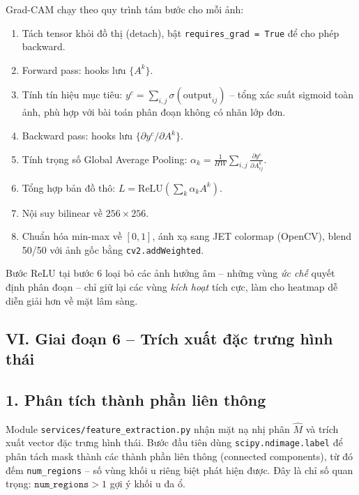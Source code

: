 Grad-CAM chạy theo quy trình tám bước cho mỗi ảnh:

\begin{enumerate}
    \item Tách tensor khỏi đồ thị (detach), bật \texttt{requires\_grad = True} để cho phép backward.
    \item Forward pass: hooks lưu $\{A^k\}$.
    \item Tính tín hiệu mục tiêu: $y^c = \sum_{i,j} \sigma(\text{output}_{ij})$ -- tổng xác suất sigmoid toàn ảnh, phù hợp với bài toán phân đoạn không có nhãn lớp đơn.
    \item Backward pass: hooks lưu $\{\partial y^c / \partial A^k\}$.
    \item Tính trọng số Global Average Pooling: $\alpha_k = \frac{1}{HW}\sum_{i,j} \frac{\partial y^c}{\partial A^k_{ij}}$.
    \item Tổng hợp bản đồ thô: $L = \text{ReLU}\!\left(\sum_k \alpha_k A^k\right)$.
    \item Nội suy bilinear về $256\times256$.
    \item Chuẩn hóa min-max về $[0, 1]$, ánh xạ sang JET colormap (OpenCV), blend 50/50 với ảnh gốc bằng \texttt{cv2.addWeighted}.
\end{enumerate}

Bước ReLU tại bước 6 loại bỏ các ảnh hưởng âm -- những vùng \textit{ức chế} quyết định phân đoạn -- chỉ giữ lại các vùng \textit{kích hoạt} tích cực, làm cho heatmap dễ diễn giải hơn về mặt lâm sàng.

\subsection*{VI. Giai đoạn 6 -- Trích xuất đặc trưng hình thái}

\subsection*{1. Phân tích thành phần liên thông}

Module \texttt{services/feature\_extraction.py} nhận mặt nạ nhị phân $\hat{M}$ và trích xuất vector đặc trưng hình thái. Bước đầu tiên dùng \texttt{scipy.ndimage.label} để phân tách mask thành các thành phần liên thông (connected components), từ đó đếm \texttt{num\_regions} -- số vùng khối u riêng biệt phát hiện được. Đây là chỉ số quan trọng: $\texttt{num\_regions} > 1$ gợi ý khối u đa ổ.

